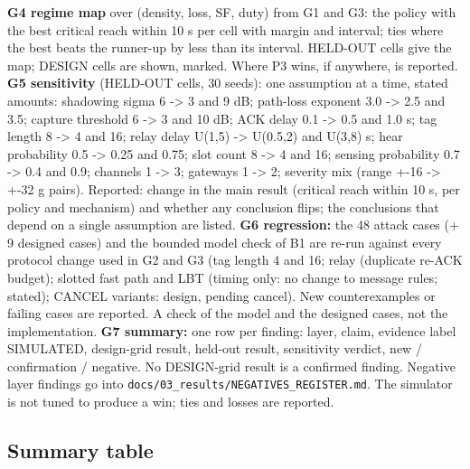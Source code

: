 \textbf{G4 regime map} over (density, loss, SF, duty) from G1 and G3: the policy with the best critical reach within 10 s per cell with margin and interval; ties where the best beats the runner-up by less than its interval. HELD-OUT cells give the map; DESIGN cells are shown, marked. Where P3 wins, if anywhere, is reported.
\textbf{G5 sensitivity} (HELD-OUT cells, 30 seeds): one assumption at a time, stated amounts: shadowing sigma 6 -> 3 and 9 dB; path-loss exponent 3.0 -> 2.5 and 3.5; capture threshold 6 -> 3 and 10 dB; ACK delay 0.1 -> 0.5 and 1.0 s; tag length 8 -> 4 and 16; relay delay U(1,5) -> U(0.5,2) and U(3,8) s; hear probability 0.5 -> 0.25 and 0.75; slot count 8 -> 4 and 16; sensing probability 0.7 -> 0.4 and 0.9; channels 1 -> 3; gateways 1 -> 2; severity mix (range +-16 -> +-32 g pairs). Reported: change in the main result (critical reach within 10 s, per policy and mechanism) and whether any conclusion flips; the conclusions that depend on a single assumption are listed.
\textbf{G6 regression:} the 48 attack cases (+ 9 designed cases) and the bounded model check of B1 are re-run against every protocol change used in G2 and G3 (tag length 4 and 16; relay (duplicate re-ACK budget); slotted fast path and LBT (timing only: no change to message rules; stated); CANCEL variants: design, pending cancel). New counterexamples or failing cases are reported. A check of the model and the designed cases, not the implementation.
\textbf{G7 summary:} one row per finding: layer, claim, evidence label SIMULATED, design-grid result, held-out result, sensitivity verdict, new / confirmation / negative. No DESIGN-grid result is a confirmed finding. Negative layer findings go into \texttt{docs/03\_results/NEGATIVES\_REGISTER.md}. The simulator is not tuned to produce a win; ties and losses are reported.

\subsection*{Summary table}

